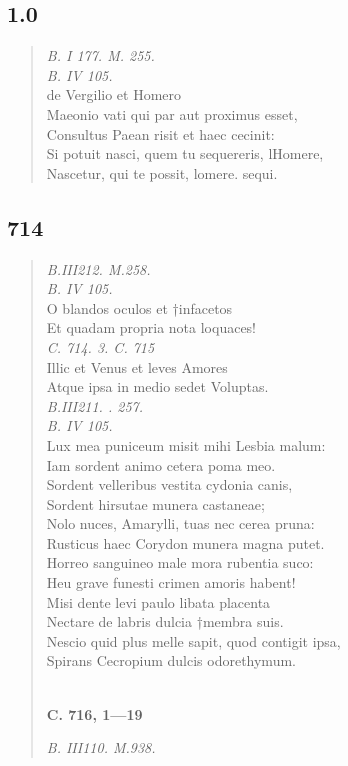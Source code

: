\documentclass[11pt, a4paper]{report}
\begin{document}
            \subsection*{1.0}
      \begin{verse}
      \textit{B. I 177. M. 255.} \\ \textit{B. IV 105.} \\ de Vergilio et Homero \\ Maeonio vati qui par aut proximus esset, \\ Consultus Paean risit et haec cecinit: \\ Si potuit nasci, quem tu sequereris, lHomere, \\ Nascetur, qui te possit, lomere. sequi. \\ 
      \end{verse}
  
            \subsection*{714}
      \begin{verse}
      \textit{B.III212. M.258.} \\ \textit{B. IV 105.} \\ O blandos oculos et †infacetos \\ Et quadam propria nota loquaces! \\ 
        ﻿\pagebreak 
    \textit{C. 714. 3. C. 715} \\ Illic et Venus et leves Amores \\ Atque ipsa in medio sedet Voluptas. \\ \textit{B.III211. . 257.} \\ \textit{B. IV 105.} \\ Lux mea puniceum misit mihi Lesbia malum: \\ Iam sordent animo cetera poma meo. \\ Sordent velleribus vestita cydonia canis, \\ Sordent hirsutae munera castaneae; \\ Nolo nuces, Amarylli, tuas nec cerea pruna: \\ Rusticus haec Corydon munera magna putet. \\ Horreo sanguineo male mora rubentia suco: \\ Heu grave funesti crimen amoris habent! \\ Misi dente levi paulo libata placenta \\ Nectare de labris dulcia †membra suis. \\ Nescio quid plus melle sapit, quod contigit ipsa, \\ Spirans Cecropium dulcis odorethymum. \\ 
        ﻿\pagebreak 
     \marginpar{[179]} \begin{center} \textbf{C. 716, 1—19} \end{center}\textit{B. III110. M.938.} \\ 
      \end{verse}
  
\end{document}

